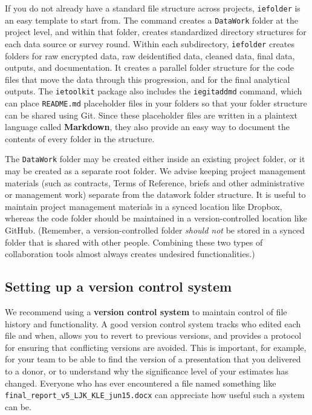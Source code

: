 If you do not already have a standard file structure across projects,
\texttt{iefolder} is an easy template to start from.
The command creates a \texttt{DataWork} folder at the project level,
and within that folder, creates standardized directory structures
for each data source or survey round.
Within each subdirectory, \texttt{iefolder} creates folders for raw encrypted data,
raw deidentified data, cleaned data, final data, outputs, and documentation.
It creates a parallel folder structure for the code files
that move the data through this progression,
and for the final analytical outputs.
The \texttt{ietoolkit} package also includes the \texttt{iegitaddmd} command,
which can place \texttt{README.md} placeholder files in your folders so that
your folder structure can be shared using Git.
Since these placeholder files are written in a plaintext language called \textbf{Markdown},
they also provide an easy way to document the contents of every folder in the structure.

The \texttt{DataWork} folder may be created either inside
an existing project folder, or it may be created as a separate root folder.
We advise keeping project management materials
(such as contracts, Terms of Reference, briefs and other administrative or management work) 
separate from the datawork folder structure.
It is useful to maintain project management materials in a synced location like Dropbox,
whereas the code folder should be maintained in a version-controlled location like GitHub.
(Remember, a version-controlled folder \textit{should not}
be stored in a synced folder that is shared with other people.
Combining these two types of collaboration tools 
almost always creates undesired functionalities.)

\subsection{Setting up a version control system}
We recommend using a \textbf{version control system} to 
maintain control of file history and functionality.
A good version control system tracks who edited each file and when,
allows you to revert to previous versions,
and provides a protocol for ensuring that conflicting versions are avoided.
This is important, for example, for your team
to be able to find the version of a presentation that you delivered to a donor,
or to understand why the significance level of your estimates has changed.
Everyone who has ever encountered a file named something like \texttt{final\_report\_v5\_LJK\_KLE\_jun15.docx}
can appreciate how useful such a system can be.

